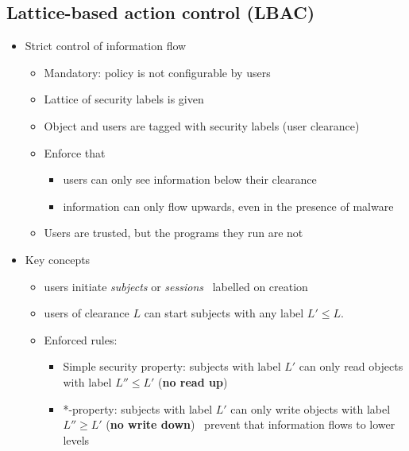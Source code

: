 \documentclass[12pt,titlepage,a4paper]{report}
\begin{document}
	\subsection{Lattice-based action control (LBAC)}
	\begin{itemize}
		\item Strict control of information flow
		\begin{itemize}
			\item Mandatory: policy is not configurable by users
			\item Lattice of security labels is given
			\item Object and users are tagged with security labels (user clearance)
			\item Enforce that
			\begin{itemize}
				\item users can only see information below their clearance
				\item information can only flow upwards, even in the presence of malware
			\end{itemize}
			\item Users are trusted, but the programs they run are not
		\end{itemize}
		\item Key concepts
		\begin{itemize}
			\item users initiate \textit{subjects} or \textit{sessions} \textrightarrow \, labelled on creation
			\item users of clearance $L$ can start subjects with any label $L' \leq L$.
			\item Enforced rules:
			\begin{itemize}
				\item Simple security property: subjects with label $L'$ can only read objects with label $L'' \leq L'$ (\textbf{no read up})
				\item *-property: subjects with label $L'$ can only write objects with label $L'' \geq L'$ (\textbf{no write down}) \textrightarrow \, prevent that information flows to lower levels
			\end{itemize}
		\end{itemize}
	\end{itemize}
\end{document}
